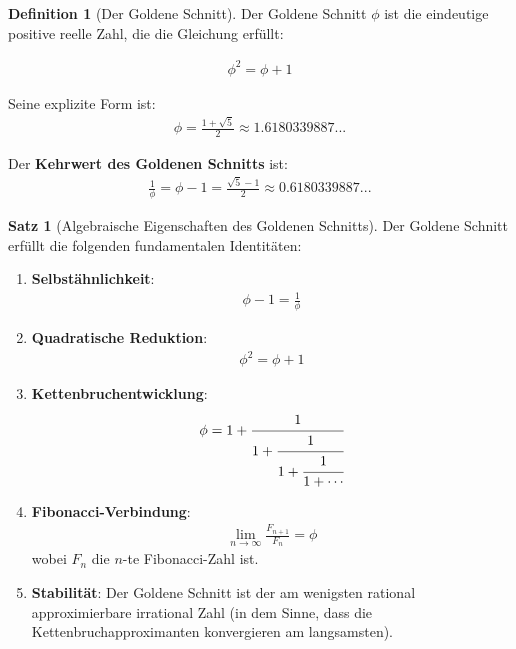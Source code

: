 \documentclass[a4paper, 12pt, twoside, openright]{report}
\theoremstyle{definition}
\newtheorem{definition}[theorem]{Definition}
\theoremstyle{definition}
\newtheorem{satz}{Satz}[chapter]
\begin{document}
\begin{definition}[Der Goldene Schnitt]
Der Goldene Schnitt $\phi$ ist die eindeutige positive reelle Zahl, die die Gleichung erfüllt:

\begin{align}
\phi^2 = \phi + 1
\end{align}

Seine explizite Form ist:
\begin{align}
\phi = \frac{1 + \sqrt{5}}{2} \approx 1.6180339887...
\end{align}

Der \textbf{Kehrwert des Goldenen Schnitts} ist:
\begin{align}
\frac{1}{\phi} = \phi - 1 = \frac{\sqrt{5} - 1}{2} \approx 0.6180339887...
\end{align}
\end{definition}

\begin{satz}[Algebraische Eigenschaften des Goldenen Schnitts]
Der Goldene Schnitt erfüllt die folgenden fundamentalen Identitäten:

\begin{enumerate}
	\item \textbf{Selbstähnlichkeit}: 
	\begin{align}
	\phi - 1 = \frac{1}{\phi}
	\end{align}
	
	\item \textbf{Quadratische Reduktion}: 
	\begin{align}
	\phi^2 = \phi + 1
	\end{align}
	
	\item \textbf{Kettenbruchentwicklung}: 
	\begin{align}
	\phi = 1 + \cfrac{1}{1 + \cfrac{1}{1 + \cfrac{1}{1 + \cdots}}}
	\end{align}
	
	\item \textbf{Fibonacci-Verbindung}: 
	\begin{align}
	\lim_{n \to \infty} \frac{F_{n+1}}{F_n} = \phi
	\end{align}
	wobei $F_n$ die $n$-te Fibonacci-Zahl ist.
	
	\item \textbf{Stabilität}: Der Goldene Schnitt ist der am wenigsten rational approximierbare irrational Zahl (in dem Sinne, dass die Kettenbruchapproximanten konvergieren am langsamsten).
\end{enumerate}
\end{satz}
\end{document}
